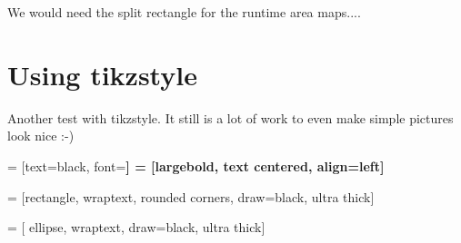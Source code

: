 We would need the split rectangle for the runtime area maps....


\section{Using tikzstyle}

Another test with tikzstyle. It still is a lot of work to even make simple pictures look nice :-)


 = [text=black, font=\bfseries\large]
 = [largebold, text centered, align=left]

 = [rectangle,
                                wraptext,
                                rounded corners,
                                draw=black,
                                ultra thick]

 = [   ellipse,
                            wraptext,
                            draw=black,
                            ultra thick]

